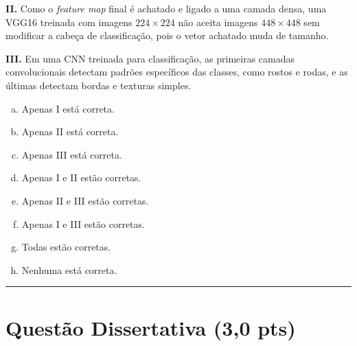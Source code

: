 \documentclass[11pt,a4paper]{article}
\begin{document}
\begin{enumerate}[1)]
\textbf{II.} Como o \textit{feature map} final é achatado e ligado a uma camada densa, uma VGG16 treinada com imagens $224 \times 224$ não aceita imagens $448 \times 448$ sem modificar a cabeça de classificação, pois o vetor achatado muda de tamanho.

\textbf{III.} Em uma CNN treinada para classificação, as primeiras camadas convolucionais detectam padrões específicos das classes, como rostos e rodas, e as últimas detectam bordas e texturas simples.

\begin{enumerate}[a)]
    \item Apenas I está correta.
    \item Apenas II está correta.
    \item Apenas III está correta.
    \item Apenas I e II estão corretas.
    \item Apenas II e III estão corretas.
    \item Apenas I e III estão corretas.
    \item Todas estão corretas.
    \item Nenhuma está correta.
\end{enumerate}

\end{enumerate}

\rule{\linewidth}{0.4pt}

\section*{Questão Dissertativa (3{,}0 pts)}
\end{document}
